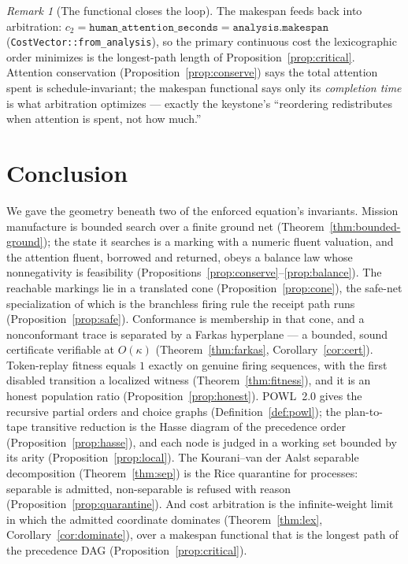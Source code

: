 \documentclass[11pt,oneside]{book}
\theoremstyle{definition}
\theoremstyle{plain}
\theoremstyle{remark}
\newtheorem*{remark}{Remark}
\newcommand{\CL}{\kappa}                       %
\newcommand{\code}[1]{\texttt{#1}}
\begin{document}
\begin{remark}[The functional closes the loop]
The makespan feeds back into arbitration: $c_2=\code{human\_attention\_seconds}
=\code{analysis.makespan}$ (\code{CostVector::from\_analysis}), so the primary continuous cost
the lexicographic order minimizes is the longest-path length of Proposition~\ref{prop:critical}.
Attention conservation (Proposition~\ref{prop:conserve}) says the total attention spent is
schedule-invariant; the makespan functional says only its \emph{completion time} is what
arbitration optimizes --- exactly the keystone's ``reordering redistributes when attention is
spent, not how much.''
\end{remark}

\chapter{Conclusion}

We gave the geometry beneath two of the enforced equation's invariants. Mission manufacture is
bounded search over a finite ground net (Theorem~\ref{thm:bounded-ground}); the state it
searches is a marking with a numeric fluent valuation, and the attention fluent, borrowed and
returned, obeys a balance law whose nonnegativity is feasibility
(Propositions~\ref{prop:conserve}--\ref{prop:balance}). The reachable markings lie in a
translated cone (Proposition~\ref{prop:cone}), the safe-net specialization of which is the
branchless firing rule the receipt path runs (Proposition~\ref{prop:safe}). Conformance is
membership in that cone, and a nonconformant trace is separated by a Farkas hyperplane --- a
bounded, sound certificate verifiable at $O(\CL)$ (Theorem~\ref{thm:farkas},
Corollary~\ref{cor:cert}). Token-replay fitness equals $1$ exactly on genuine firing sequences,
with the first disabled transition a localized witness (Theorem~\ref{thm:fitness}), and it is an
honest population ratio (Proposition~\ref{prop:honest}). POWL~2.0 gives the recursive partial
orders and choice graphs (Definition~\ref{def:powl}); the plan-to-tape transitive reduction is
the Hasse diagram of the precedence order (Proposition~\ref{prop:hasse}), and each node is
judged in a working set bounded by its arity (Proposition~\ref{prop:local}). The
Kourani--van der Aalst separable decomposition (Theorem~\ref{thm:sep}) is the Rice quarantine
for processes: separable is admitted, non-separable is refused with reason
(Proposition~\ref{prop:quarantine}). And cost arbitration is the infinite-weight limit in which
the admitted coordinate dominates (Theorem~\ref{thm:lex}, Corollary~\ref{cor:dominate}), over a
makespan functional that is the longest path of the precedence DAG
(Proposition~\ref{prop:critical}).
\end{document}
